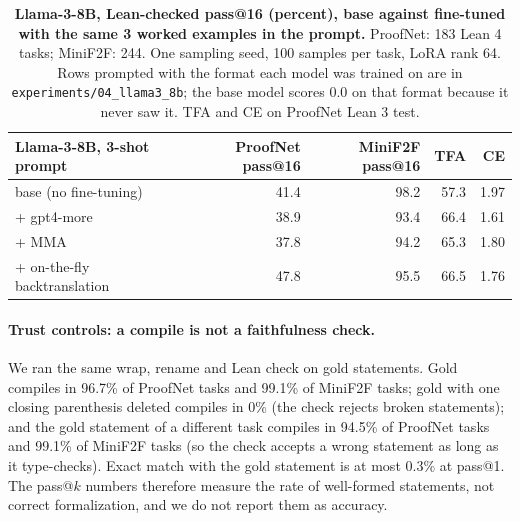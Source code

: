 \documentclass{article} %
\begin{document}
\begin{table}[ht]
\centering
\small
\renewcommand{\arraystretch}{1.15}
\begin{tabular}{|l|r|r|r|r|}
\hline
\textbf{Llama-3-8B, 3-shot prompt} & \textbf{ProofNet pass@16} & \textbf{MiniF2F pass@16} & \textbf{TFA} & \textbf{CE} \\
\hline
base (no fine-tuning) & 41.4 & 98.2 & 57.3 & 1.97 \\
+ gpt4-more & 38.9 & 93.4 & 66.4 & 1.61 \\
+ MMA & 37.8 & 94.2 & 65.3 & 1.80 \\
+ on-the-fly backtranslation & 47.8 & 95.5 & 66.5 & 1.76 \\
\hline
\end{tabular}
\caption{\textbf{Llama-3-8B, Lean-checked pass@16 (percent), base against fine-tuned with the same 3 worked examples in the prompt.} ProofNet: 183 Lean 4 tasks; MiniF2F: 244. One sampling seed, 100 samples per task, LoRA rank 64. Rows prompted with the format each model was trained on are in \texttt{experiments/04\_llama3\_8b}; the base model scores 0.0 on that format because it never saw it. TFA and CE on ProofNet Lean 3 test.}
\label{table:passk_llama}
\end{table}

\paragraph{Trust controls: a compile is not a faithfulness check.} We ran the same wrap, rename and Lean check on gold statements. Gold compiles in 96.7\% of ProofNet tasks and 99.1\% of MiniF2F tasks; gold with one closing parenthesis deleted compiles in 0\% (the check rejects broken statements); and the gold statement of a different task compiles in 94.5\% of ProofNet tasks and 99.1\% of MiniF2F tasks (so the check accepts a wrong statement as long as it type-checks). Exact match with the gold statement is at most 0.3\% at pass@1. The pass@$k$ numbers therefore measure the rate of well-formed statements, not correct formalization, and we do not report them as accuracy.
\end{document}
